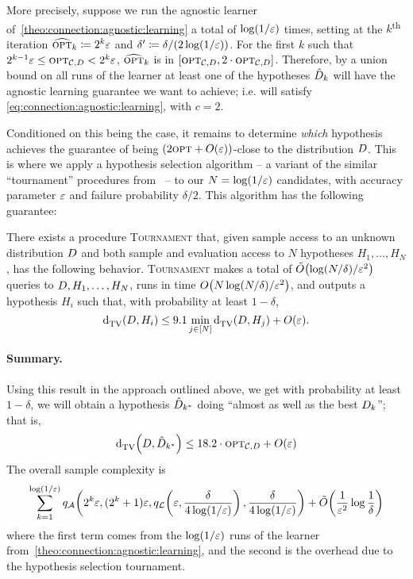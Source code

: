 More precisely, suppose we run the agnostic learner of~\autoref{theo:connection:agnostic:learning} a total of $\log(1/\varepsilon)$ times, setting at the $k$\textsuperscript{th} iteration $\widehat{{\textsc{opt}}}_k\coloneqq 2^k\varepsilon$ and $\delta^\prime\coloneqq \delta/(2\log(1/\varepsilon))$. For the first $k$ such that $2^{k-1}\varepsilon \leq {\textsc{opt}}_{\mathcal{C},D} < 2^k\varepsilon$, $\widehat{{\textsc{opt}}}_k$ is in $[{\textsc{opt}}_{\mathcal{C},D}, 2\cdot {\textsc{opt}}_{\mathcal{C},D}]$. Therefore, by a union bound on all runs of the learner at least one of the hypotheses $\hat{D}_k$ will have the agnostic learning guarantee we want to achieve; i.e. will satisfy \eqref{eq:connection:agnostic:learning}, with $c=2$.

Conditioned on this being the case, it remains to determine \emph{which} hypothesis achieves the guarantee of being $(2\opt+\bigO{\eps})$-close to the distribution $D$. This is where 
we apply a hypothesis selection algorithm -- a variant of the similar ``tournament'' procedures from~\cite{DL:01,DK:13,AJOS:14:ISIT} -- to our $N=\log(1/\varepsilon)$ candidates, 
with accuracy parameter $\varepsilon$ and failure probability $\delta/2$. This algorithm has the following guarantee:
\begin{proposition}[\cite{CK:15}]\label{prop:tournament}
  There exists a procedure \textsc{Tournament} that, given sample access to an unknown distribution $D$ and both sample and evaluation access to $N$ hypotheses $H_1,\dots,H_N$, has the following behavior. \textsc{Tournament} makes a total of $\tildeO{{\log(N/\delta)}/{\eps^2}}$ queries to $D,H_1,\dots,H_N$, runs in time $\bigO{{N\log(N/\delta)}/{\eps^2}}$, and outputs a hypothesis $H_i$ such that, with probability at least $1-\delta$,
  \[
      \totalvardist{\D}{H_i} \leq 9.1 \min_{j\in[N] } \totalvardist{\D}{H_j} + \bigO{\eps}.
  \]
\end{proposition}

\paragraph*{Summary.} Using this result in the approach outlined above, we get with probability at least $1-\delta$, we will obtain a hypothesis $\hat{D}_{k^\ast}$ doing ``almost as well as the best $D_k$''; that is,
\[
	\totalvardist{ \D }{ \hat{\D}_{k^\ast} } \leq 18.2\cdot \opt_{\class,\D} + \bigO{\eps}
\]
The overall sample complexity is
\[
	\sum_{k=1}^{\log(1/\eps)}q_\Algo\!\left(2^k\eps,(2^{k}+1)\eps, q_\Learner\!\left(\eps,\frac{\delta}{4\log(1/\eps)}\right),\frac{\delta}{4\log(1/\eps)}\right) + \tildeO{ \frac{1}{\eps^2}\log\frac{1}{\delta} } 
\]
where the first term comes from the $\log(1/\varepsilon)$ runs of the learner from~\autoref{theo:connection:agnostic:learning}, and the second is the overhead due to the hypothesis selection tournament.




